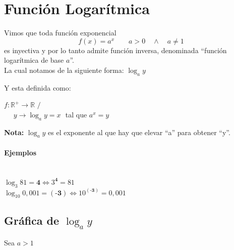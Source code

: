 \section{Función Logarítmica}

Vimos que toda función exponencial\\
$$f(x)=a^x \qquad a>0\quad \wedge \quad a\neq 1$$
\qquad es inyectiva y por lo tanto admite función inversa, denominada ``función logarítmica de base $a$''.\\

La cual notamos de la siguiente forma: $\log _a y$

Y esta definida como:

\begin{center}
$f: \mathbb{R}^+ \longrightarrow \mathbb{R} $ $/$ \qquad $ $\\
$ $ \qquad $ $ \qquad $ $ \qquad $ $ \qquad $ y \longrightarrow \log _a y = x$ $ $ tal que $ a^x=y$\\
\end{center}
\qquad \qquad \textbf{Nota:} $\log _a y$ es el exponente al que hay que elevar ``a'' para obtener ``y''.

\paragraph{Ejemplos}
\qquad \\

\qquad $\log _3 81 = \textbf{4} \Leftrightarrow 3^{\textbf{4}} =81$\\

\qquad $\log _10 0,001= (\textbf{-3}) \Leftrightarrow 10^{(\textbf{-3})} = 0,001$\\

\subsection{Gráfica de $\log _a y$}

Sea $a>1$\\

